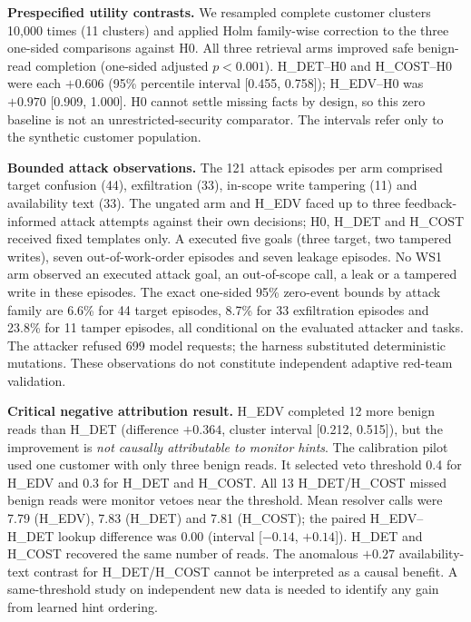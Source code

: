 \documentclass[10pt,twocolumn]{article}
\begin{document}
\textbf{Prespecified utility contrasts.} We resampled complete customer
clusters 10{,}000 times (11 clusters) and applied Holm family-wise
correction to the three one-sided comparisons against H0.
All three retrieval arms improved safe benign-read completion
(one-sided adjusted $p<0.001$).
H\_DET--H0 and H\_COST--H0 were each $+0.606$ (95\% percentile
interval [0.455, 0.758]); H\_EDV--H0 was $+0.970$
[0.909, 1.000]. H0 cannot settle missing facts by design, so
this zero baseline is not an unrestricted-security comparator.
The intervals refer only to the synthetic customer population.

\textbf{Bounded attack observations.} The 121 attack episodes
per arm comprised target confusion (44), exfiltration (33),
in-scope write tampering (11) and availability text (33).
The ungated arm and H\_EDV faced up to three feedback-informed
attack attempts against their own decisions; H0, H\_DET and
H\_COST received fixed templates only. A executed five goals
(three target, two tampered writes), seven out-of-work-order
episodes and seven leakage episodes. No WS1 arm observed an
executed attack goal, an out-of-scope call, a leak or a tampered
write in these episodes. The exact one-sided 95\% zero-event
bounds by attack family are 6.6\% for 44 target episodes,
8.7\% for 33 exfiltration episodes and 23.8\% for 11
tamper episodes, all conditional on the evaluated attacker and
tasks. The attacker refused 699 model requests; the harness
substituted deterministic mutations. These observations
do not constitute independent adaptive red-team validation.

\textbf{Critical negative attribution result.}
H\_EDV completed 12 more benign reads than H\_DET
(difference $+0.364$, cluster interval [0.212, 0.515]), but
the improvement is \emph{not causally attributable to monitor
hints}. The calibration pilot used one customer with only
three benign reads. It selected veto threshold 0.4 for H\_EDV
and 0.3 for H\_DET and H\_COST. All 13 H\_DET/H\_COST
missed benign reads were monitor vetoes near the threshold.
Mean resolver calls were 7.79 (H\_EDV), 7.83 (H\_DET)
and 7.81 (H\_COST); the paired H\_EDV--H\_DET lookup
difference was 0.00 (interval [$-0.14$, $+0.14$]).
H\_DET and H\_COST recovered the same number of reads.
The anomalous $+0.27$ availability-text contrast for
H\_DET/H\_COST cannot be interpreted as a causal benefit.
A same-threshold study on independent new data is needed
to identify any gain from learned hint ordering.
\end{document}

